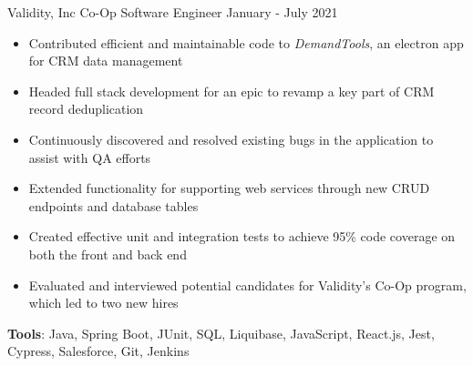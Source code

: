 \documentclass{awesome-cv}
\begin{document}
		\vspace{-0.2cm}

		\begin{cventries}
			\vspace{-0.15cm}
			\cventry
				{Validity, Inc}
				{Co-Op Software Engineer}
				{January - July 2021}
				{}
				{
					\vspace{-0.3cm}
					\begin{itemize}[nosep]
						\item Contributed efficient and maintainable code to \textit{DemandTools}, an electron app for CRM data management
						\item Headed full stack development for an epic to revamp a key part of CRM record deduplication
						\item Continuously discovered and resolved existing bugs in the application to assist with QA efforts
						\item Extended functionality for supporting web services through new CRUD endpoints and database tables
						\item Created effective unit and integration tests to achieve 95\% code coverage on both the front and back end
						\item Evaluated and interviewed potential candidates for Validity's Co-Op program, which led to two new hires
					\end{itemize}
					\vspace{0.2cm}
					\qquad \textbf{Tools}: Java, Spring Boot, JUnit, SQL, Liquibase, JavaScript, React.js, Jest, Cypress, Salesforce, Git, Jenkins
				}
		\end{cventries}
		\vspace{-0.1cm}
\end{document}
